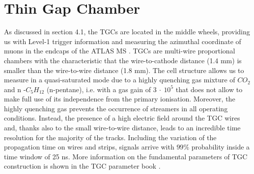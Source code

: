 \documentclass[11pt,a4paper,twoside,openright]{report}
\begin{document}
\section{Thin Gap Chamber}
As discussed in section 4.1, the TGCs are located in the middle wheels, providing us with Level-1 trigger information and measuring the azimuthal coordinate of muons in the endcaps of the ATLAS MS \cite{TGC1}. TGCs are multi-wire proportional chambers with the characteristic that the wire-to-cathode distance  (1.4 mm) is smaller than the wire-to-wire distance (1.8 mm). The cell structure allows us to measure in a quasi-saturated mode due to a highly quenching gas mixture of \(CO_2\) and \(\text{n -} C_5H_{12}\) (n-pentane), i.e. with a gas gain of \(3\ \cdot\ 10^5\) that does not allow to make full use of its independence from the primary ionisation. Moreover, the highly quenching gas prevents the occurrence of streamers in all operating conditions. Instead, the presence of a high electric field around the TGC wires and, thanks also to the small wire-to-wire distance, leads to an incredible time resolution for the majority of the tracks. Including the variation of the propagation time on wires and strips, signals arrive with \(99\%\) probability inside a time window of 25 ns. More information on the fundamental parameters of TGC construction is shown in the TGC parameter book \cite{TGC}.
\end{document}
